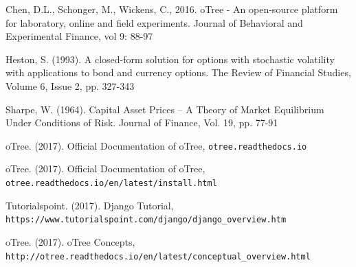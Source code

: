 
\begin{thebibliography}{XX}
	
 Chen, D.L., Schonger, M., Wickens, C., 2016. oTree - An open-source platform for laboratory, online and field experiments. Journal of Behavioral and Experimental Finance, vol 9: 88-97

 Heston, S. (1993). A closed-form solution for options with stochastic volatility with applications to bond and currency options.
The Review of Financial Studies, Volume 6, Issue 2, pp. 327-343

 Sharpe, W. (1964). Capital Asset Prices -- A Theory of Market Equilibrium Under Conditions of Risk. Journal of Finance, Vol. 19, pp. 77-91

 oTree. (2017). Official Documentation of oTree, \verb|otree.readthedocs.io|

 oTree. (2017). Official Documentation of oTree,\\ \verb|otree.readthedocs.io/en/latest/install.html|

 Tutorialspoint. (2017). Django Tutorial,\\ \verb|https://www.tutorialspoint.com/django/django_overview.htm|

 oTree. (2017). oTree Concepts,\\ \verb|http://otree.readthedocs.io/en/latest/conceptual_overview.html|



\end{thebibliography}




